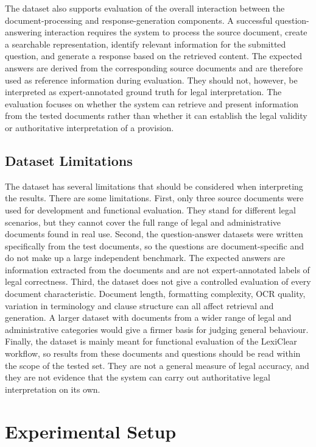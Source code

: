 \documentclass[12pt,a4paper,oneside]{report}
\begin{document}
The dataset also supports evaluation of the overall interaction between the
document-processing and response-generation components. A successful
question-answering interaction requires the system to process the source
document, create a searchable representation, identify relevant information
for the submitted question, and generate a response based on the retrieved
content. The expected answers are derived from the corresponding source documents and
are therefore used as reference information during evaluation. They should
not, however, be interpreted as expert-annotated ground truth for legal
interpretation. The evaluation focuses on whether the system can retrieve and
present information from the tested documents rather than whether it can
establish the legal validity or authoritative interpretation of a provision.

\subsection{Dataset Limitations}

The dataset has several limitations that should be considered when
interpreting the results. There are some limitations. First, only three source documents were used for development and functional evaluation. They stand for different legal scenarios, but they cannot cover the full range of legal and administrative documents found in real use. Second, the question-answer datasets were written specifically from the test documents, so the questions are document-specific and do not make up a large independent benchmark. The expected answers are information extracted from the documents and are not expert-annotated labels of legal correctness. Third, the dataset does not give a controlled evaluation of every document characteristic. Document length, formatting complexity, OCR quality, variation in terminology and clause structure can all affect retrieval and generation. A larger dataset with documents from a wider range of legal and administrative categories would give a firmer basis for judging general behaviour. Finally, the dataset is mainly meant for functional evaluation of the LexiClear workflow, so results from these documents and questions should be read within the scope of the tested set. They are not a general measure of legal accuracy, and they are not evidence that the system can carry out authoritative legal interpretation on its own.

\section{Experimental Setup}
\end{document}
